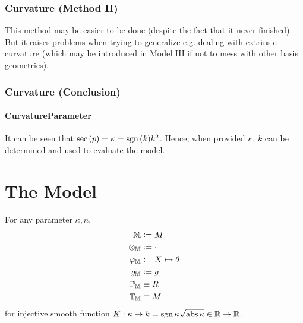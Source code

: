 \documentclass[stu, babel, american, biblatex, a4paper, draftall]{apa7}
\begin{document}
\subsubsection{Curvature (Method II)}
This method may be easier to be done
(despite the fact that it never finished).
But it raises problems when trying to generalize e.g. dealing with extrinsic curvature
(which may be introduced in Model III
if not to mess with other basis geometries).
\begin{lemma}\label{ChristoffelSymbol}

\end{lemma}
\begin{lemma}\label{RiemannCurvatureTensor}

\end{lemma}
\subsubsection{Curvature (Conclusion)}
\begin{lemma}\label{SectionalCurvature}

\end{lemma}
\paragraph{CurvatureParameter}
It can be seen that $\operatorname{sec}\left(p\right) = \kappa = \operatorname{sgn}{\left(k\right)}k^2$.
Hence, when provided $\kappa$, $k$ can be determined and used to evaluate the model.
\section{The Model}
\begin{ModelGroupElement}
    For any parameter $\kappa, n$,
    \begin{align*}
        \elements                   & \defeq M                                    \\
        \groupoperation{\elements}  & \defeq \cdot                                \\
        \charts{\elements}          & \defeq \tensor{X}{}\mapsto\tensor{\theta}{} \\
        \innerprod{\elements}       & \defeq g                                    \\
        \points{\elements}          & \equiv R                                    \\
        \transformations{\elements} & \equiv M                                    \\
    \end{align*}
    for injective smooth function $K:\kappa \mapsto k = \operatorname{sgn}{\kappa}\sqrt{\operatorname{abs}{\kappa}}\in\mathbb{R}\to\mathbb{R}$.
\end{ModelGroupElement}
\begin{ModelGroupAssertion}
\end{ModelGroupAssertion}
\begin{ModelCurvatureAssertion}
\end{ModelCurvatureAssertion}
\end{document}
